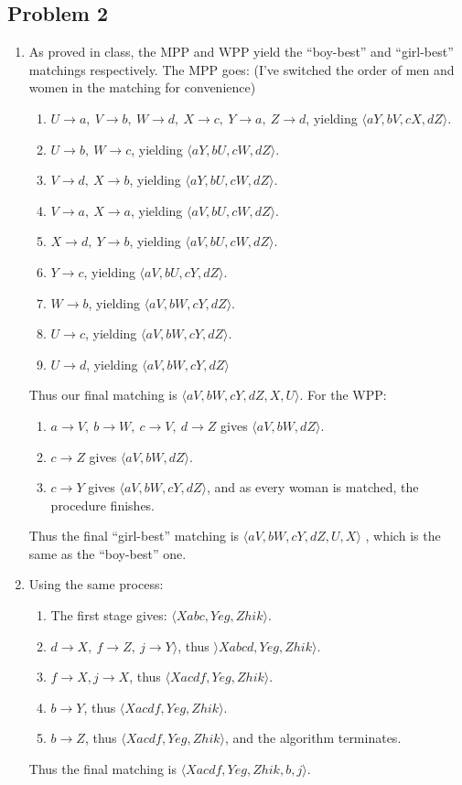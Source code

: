 \documentclass[11pt]{article}
\begin{document}
\subsection*{Problem 2}
\begin{enumerate}[label=(\alph*)]
\item As proved in class, the MPP and WPP yield the ``boy-best'' and
  ``girl-best'' matchings respectively. The MPP goes: (I've switched the order
  of men and women in the matching for convenience)
  \begin{enumerate}[label=(\roman*)]
  \item $U\to a,\ V\to b,\ W\to d,\ X\to c,\ Y\to a,\ Z\to d$, yielding $\langle
    aY, bV, cX, dZ\rangle$.
  \item $U\to b,\ W\to c$, yielding $\langle aY, bU, cW, dZ\rangle$.
  \item $V\to d,\ X\to b$, yielding $\langle aY, bU, cW, dZ\rangle$.
  \item $V\to a,\ X\to a$, yielding $\langle aV, bU, cW, dZ\rangle$.
  \item $X\to d,\ Y\to b$, yielding $\langle aV, bU, cW, dZ\rangle$.
  \item $Y\to c$, yielding $\langle aV, bU, cY, dZ\rangle$.
  \item $W\to b$, yielding $\langle aV, bW, cY, dZ\rangle$.
  \item $U\to c$, yielding $\langle aV, bW, cY, dZ\rangle$.
  \item $U\to d$, yielding $\langle aV, bW, cY, dZ\rangle$
  \end{enumerate}
  Thus our final matching is $\langle aV, bW, cY, dZ, X, U\rangle$. For the WPP:
  \begin{enumerate}[label=(\roman*)]
  \item $a\to V,\ b\to W,\ c\to V,\ d\to Z$ gives $\langle aV, bW, dZ\rangle$.
  \item $c\to Z$ gives $\langle aV, bW, dZ\rangle$.
  \item $c\to Y$ gives $\langle aV, bW, cY, dZ\rangle$, and as every woman is
    matched, the procedure finishes.
  \end{enumerate}
  Thus the final ``girl-best'' matching is $\langle aV, bW, cY, dZ, U, X\rangle$
  , which is the same as the ``boy-best'' one.
\item Using the same process:
  \begin{enumerate}[label=(\roman*)]
  \item The first stage gives: $\langle Xabc, Yeg, Zhik\rangle$.
  \item $d\to X,\ f\to Z,\ j\to Y\rangle$, thus $\rangle Xabcd, Yeg, Zhik\rangle$.
  \item $f\to X, j\to X$, thus $\langle Xacdf, Yeg, Zhik\rangle$.
  \item $b\to Y$, thus $\langle Xacdf, Yeg, Zhik\rangle$.
  \item $b\to Z$, thus $\langle Xacdf, Yeg, Zhik\rangle$, and the algorithm
    terminates.
  \end{enumerate}
  Thus the final matching is $\langle Xacdf, Yeg, Zhik, b, j\rangle$.

\end{enumerate}
\end{document}
